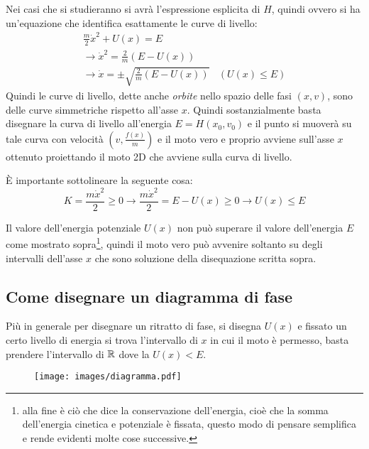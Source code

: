 \documentclass[Main.tex]{subfiles}
\begin{document}
\newpage
\begin{osservazioni}
	\item Nei casi che si studieranno si avrà l'espressione esplicita di $H$, quindi ovvero si ha un'equazione che identifica esattamente le curve di livello:
\begin{gather}
	\frac{m}{2} \dot x^2 +U(x) =E\\
	\rightarrow \dot x ^2 = \frac{2}{m} (E - U(x))\\
	\rightarrow \dot x = \pm \sqrt{\frac{2}{m}(E-U(x))} \ \ \ \ (U(x) \leq E)
\end{gather}
Quindi le curve di livello, dette anche \textit{orbite} nello spazio delle fasi $(x,v)$, sono delle curve simmetriche rispetto all'asse $x$. Quindi sostanzialmente basta disegnare la curva di livello all'energia $E=H(x_0,v_0)$ e il punto si muoverà su tale curva con velocità $(v,\frac{f(x)}{m})$ e il moto vero e proprio avviene sull'asse $x$ ottenuto proiettando il moto 2D che avviene sulla curva di livello. 

\item È importante sottolineare la seguente cosa:
\begin{equation}
  K= \frac{m\dot x ^2}{2}  \geq 0 \rightarrow \frac{m \dot x^2}{2}= E-U(x) \geq 0 \rightarrow U(x)\leq E
\end{equation}


Il valore dell'energia potenziale $U(x)$ non può superare il valore dell'energia $E$ come mostrato sopra\footnote{alla fine è ciò che dice la conservazione dell'energia, cioè che la somma dell'energia cinetica e potenziale è fissata, questo modo di pensare semplifica e rende evidenti molte cose successive.}, quindi il moto vero può avvenire soltanto su degli intervalli dell'asse $x$ che sono soluzione della disequazione scritta sopra.

\end{osservazioni}


\newpage
\subsection{Come disegnare un diagramma di fase}
Più in generale per disegnare un ritratto di fase, si disegna $U(x)$ e fissato un certo livello di energia si trova l'intervallo di $x$ in cui il moto è permesso, basta prendere l'intervallo di $\mathbb{R}$ dove la $U(x)<E$.

\begin{figure}[H]
    \centering
    \texttt{[image: images/diagramma.pdf]}
\end{figure}
\end{document}
